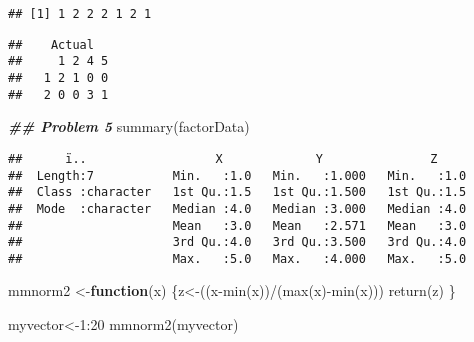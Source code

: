 \documentclass[
]{article}
\newenvironment{Shaded}{\begin{snugshade}}{\end{snugshade}}
\newcommand{\AttributeTok}[1]{\textcolor[rgb]{0.77,0.63,0.00}{#1}}
\newcommand{\ControlFlowTok}[1]{\textcolor[rgb]{0.13,0.29,0.53}{\textbf{#1}}}
\newcommand{\DecValTok}[1]{\textcolor[rgb]{0.00,0.00,0.81}{#1}}
\newcommand{\DocumentationTok}[1]{\textcolor[rgb]{0.56,0.35,0.01}{\textbf{\textit{#1}}}}
\newcommand{\FunctionTok}[1]{\textcolor[rgb]{0.00,0.00,0.00}{#1}}
\newcommand{\NormalTok}[1]{#1}
\newcommand{\OtherTok}[1]{\textcolor[rgb]{0.56,0.35,0.01}{#1}}
\newcommand{\SpecialCharTok}[1]{\textcolor[rgb]{0.00,0.00,0.00}{#1}}
\begin{document}
\begin{verbatim}
## [1] 1 2 2 2 1 2 1
\end{verbatim}

\begin{Shaded}
\end{Shaded}

\begin{verbatim}
##    Actual
##     1 2 4 5
##   1 2 1 0 0
##   2 0 0 3 1
\end{verbatim}

\begin{Shaded}
\begin{Highlighting}[]
\DocumentationTok{\#\# Problem 5}
\FunctionTok{summary}\NormalTok{(factorData)}
\end{Highlighting}
\end{Shaded}

\begin{verbatim}
##      ï..                  X             Y               Z      
##  Length:7           Min.   :1.0   Min.   :1.000   Min.   :1.0  
##  Class :character   1st Qu.:1.5   1st Qu.:1.500   1st Qu.:1.5  
##  Mode  :character   Median :4.0   Median :3.000   Median :4.0  
##                     Mean   :3.0   Mean   :2.571   Mean   :3.0  
##                     3rd Qu.:4.0   3rd Qu.:3.500   3rd Qu.:4.0  
##                     Max.   :5.0   Max.   :4.000   Max.   :5.0
\end{verbatim}

\begin{Shaded}
\begin{Highlighting}[]
\NormalTok{mmnorm2 }\OtherTok{\textless{}{-}}\ControlFlowTok{function}\NormalTok{(x)}
\NormalTok{\{z}\OtherTok{\textless{}{-}}\NormalTok{((x}\SpecialCharTok{{-}}\FunctionTok{min}\NormalTok{(x))}\SpecialCharTok{/}\NormalTok{(}\FunctionTok{max}\NormalTok{(x)}\SpecialCharTok{{-}}\FunctionTok{min}\NormalTok{(x)))}
\FunctionTok{return}\NormalTok{(z)                              }
\NormalTok{\}}

\NormalTok{myvector}\OtherTok{\textless{}{-}}\DecValTok{1}\SpecialCharTok{:}\DecValTok{20}
\FunctionTok{mmnorm2}\NormalTok{(myvector)}
\end{Highlighting}
\end{Shaded}
\end{document}
